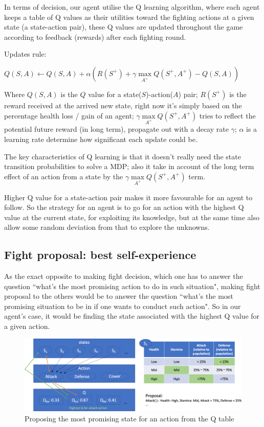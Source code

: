 In terms of decision, our agent utilise the Q learning algorithm, where each agent keeps a table of Q values as their utilities toward the fighting actions at a given state (a state-action pair), these Q values are updated throughout the game according to feedback (rewards) after each fighting round.

Updates rule:
\begin{center}
$Q(S,A) \leftarrow Q(S,A) + \alpha(R(S^+) + \gamma \max\limits_{A^+} Q(S^+,A^+) - Q(S,A))$
\end{center}
\noindent
Where $Q(S,A)$ is the $Q$ value for a state($S$)-action($A$) pair; $R(S^+)$ is the reward received at the arrived new state, right now it's simply based on the percentage health loss / gain of an agent; $\gamma \max\limits_{A^+} Q(S^+,A^+)$ tries to reflect the potential future reward (in long term), propagate out with a decay rate $\gamma$; $\alpha$ is a learning rate determine how significant each update could be.

The key characteristics of Q learning is that it doesn't really need the state transition probabilities to solve a MDP; also it take in account of the long term effect of an action from a state by the $\gamma \max\limits_{A^+} Q(S^+,A^+)$ term.

Higher Q value for a state-action pair makes it more favourable for an agent to follow. So the strategy for an agent is to go for an action with the highest Q value at the current state, for exploiting its knowledge, but at the same time also allow some random deviation from that to explore the unknowns.

\subsection{Fight proposal: best self-experience}
As the exact opposite to making fight decision, which one has to answer the question ``what's the most promising action to do in such situation", making fight proposal to the others would be to answer the question ``what's the most promising situation to be in if one wants to conduct such action". So in our agent's case, it would be finding the state associated with the highest Q value for a given action.

\begin{figure}[!h]
    \centering
    \includegraphics[width=1\textwidth]{008_team_5_agent_design/images/proposal_from_qtable.png}
    \caption{Proposing the most promising state for an action from the Q table}
    \label{fig:proposal_from_qtable}
\end{figure}

